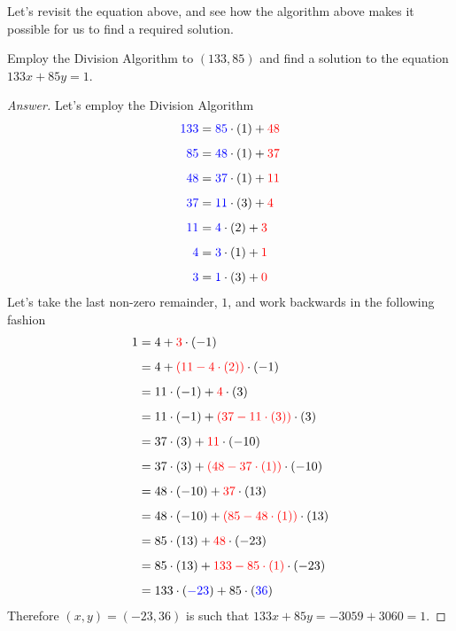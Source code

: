 Let's revisit the equation above, and see how the algorithm above makes it possible for us to find a required solution.
\begin{example}\label{example 1}
Employ the Division Algorithm to $(133,85)$ and find a solution to the equation $133x + 85y = 1$.
\end{example}
\begin{proof}[Answer]
Let's employ the Division Algorithm
\begin{align*}
{\color{blue} 133} &= {\color{blue} 85}\cdot (1) + {\color{red} 48}\\[0.5em]
{\color{blue} 85} &= {\color{blue} 48}\cdot (1) + {\color{red} 37}\\[0.5em]
{\color{blue} 48} &= {\color{blue} 37}\cdot (1) + {\color{red} 11}\\[0.5em]
{\color{blue} 37} &= {\color{blue} 11}\cdot (3) + {\color{red} 4}\\[0.5em]
{\color{blue} 11} &= {\color{blue} 4}\cdot (2) + {\color{red} 3}\\[0.5em]
{\color{blue} 4} &= {\color{blue} 3}\cdot (1) + {\color{red} 1}\\[0.5em]
{\color{blue} 3} &= {\color{blue} 1}\cdot (3) + {\color{red} 0}
\end{align*}
Let's take the last non-zero remainder, $1$, and work backwards in the following fashion
\begin{align*}
1 &= 4 + {\color{red} 3}\cdot (-1)\\[0.5em]
&= 4 + {\color{red} (11 - 4\cdot(2))}\cdot (-1)\\[0.5em]
&= 11\cdot (-1) + {\color{red} 4}\cdot (3)\\[0.5em]
&= 11\cdot (-1) + {\color{red} (37 - 11\cdot(3))}\cdot (3)\\[0.5em]
&= 37\cdot (3) + {\color{red} 11}\cdot (-10)\\[0.5em]
&= 37\cdot (3) + {\color{red} (48 - 37\cdot(1))}\cdot (-10)\\[0.5em]
&= 48\cdot (-10) + {\color{red} 37}\cdot (13)\\[0.5em]
&= 48\cdot (-10) + {\color{red} (85 - 48\cdot (1))}\cdot (13)\\[0.5em]
&= 85\cdot (13) + {\color{red} 48}\cdot (-23)\\[0.5em]
&= 85\cdot (13) + {\color{red} 133 - 85\cdot (1)}\cdot (-23)\\[0.5em]
&= 133\cdot ({\color{blue} -23}) + 85\cdot({\color{blue} 36})
\end{align*}
Therefore $(x,y) = (-23,36)$ is such that $133x + 85y = -3059 + 3060 = 1$.
\end{proof}


